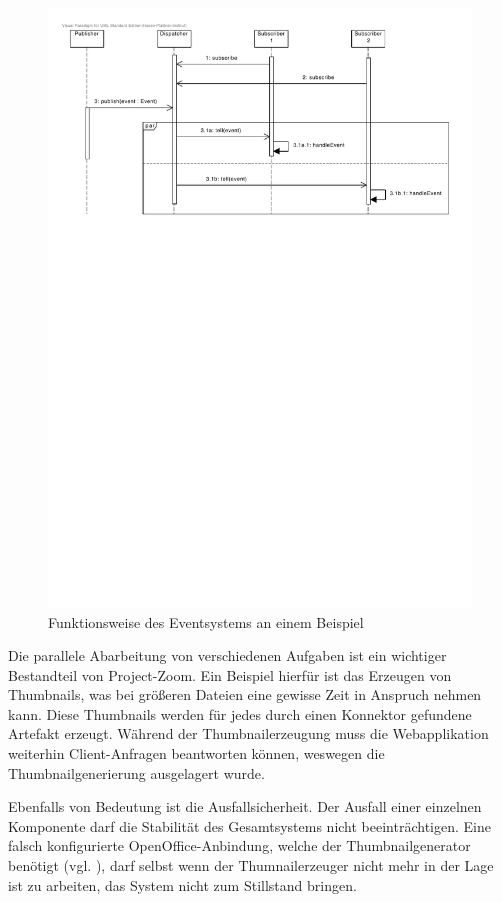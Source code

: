 \begin{figure}[h]  
  \centering     
  \includegraphics[width=1.0\textwidth]{img/eventsystem.pdf}  
   \caption{Funktionsweise des Eventsystems an einem Beispiel}   
  \label{fig:event-system} 
\end{figure}

Die parallele Abarbeitung von verschiedenen Aufgaben ist ein wichtiger Bestandteil von Project-Zoom. Ein Beispiel hierfür ist das Erzeugen von Thumbnails, was bei größeren Dateien eine gewisse Zeit in Anspruch nehmen kann. Diese Thumbnails werden für jedes durch einen Konnektor gefundene Artefakt erzeugt. Während der Thumbnailerzeugung muss die Webapplikation weiterhin Client-Anfragen beantworten können, weswegen die Thumbnailgenerierung ausgelagert wurde.

Ebenfalls von Bedeutung ist die Ausfallsicherheit. Der Ausfall einer einzelnen Komponente darf die Stabilität des Gesamtsystems nicht beeinträchtigen. Eine falsch konfigurierte OpenOffice-Anbindung, welche der Thumbnailgenerator benötigt (vgl. \cite{bp-dome}), darf selbst wenn der Thumnailerzeuger nicht mehr in der Lage ist zu arbeiten, das System nicht zum Stillstand bringen.

